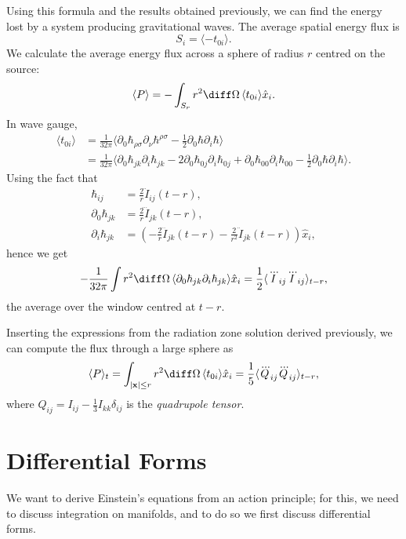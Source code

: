 \documentclass[12pt]{article}
\begin{document}
Using this formula and the results obtained previously, we can find the energy lost by a system producing gravitational waves. The average spatial energy flux is
\[
S_i = \langle - t_{0i}\rangle.
\]
We calculate the average energy flux across a sphere of radius $r$ centred on the source:
\[
\langle P \rangle = - \int_{S_r} r^2 \diff \Omega \, \langle t_{0i} \rangle \hat x_i.
\]
In wave gauge,
\begin{align*}
	\langle t_{0i}\rangle &= \frac{1}{32\pi} \langle \partial_0 \hbar_{\rho\sigma} \partial_\nu \hbar^{\rho\sigma} - \frac 12 \partial_0 \hbar \partial_i \hbar \rangle \\
			      &= \frac{1}{32 \pi} \langle \partial_0 \hbar_{jk} \partial_i \hbar_{jk} - 2 \partial_0 \hbar_{0j} \partial_i \hbar_{0j} + \partial_0 \hbar_{00} \partial_i \hbar_{00} - \frac 12 \partial_0 \hbar \partial_i \hbar \rangle.
\end{align*}
Using the fact that
\begin{align*}
	\hbar_{ij} &= \frac 2r \ddot I_{ij}(t - r), \\
	\partial_0 \hbar_{jk} &= \frac 2r \dddot I_{jk} (t - r), \\
	\partial_i \hbar_{jk} &= \left( - \frac 2r \dddot I_{jk}(t - r) - \frac{2}{r^2} \ddot I_{jk}(t - r) \right) \hat x_i,
\end{align*}
hence we get
\[
- \frac{1}{32 \pi} \int r^2 \diff \Omega \, \langle \partial_0 \hbar_{jk} \partial_i \hbar_{jk} \rangle \hat x_i = \frac 12 \langle \dddot I_{ij} \dddot I_{ij} \rangle_{t - r},
\]
the average over the window centred at $t - r$.


Inserting the expressions from the radiation zone solution derived previously, we can compute the flux through a large sphere as
\[
\langle P \rangle_t = \int_{|\mathbf{x}| \leq r} r^2 \diff \Omega \, \langle t_{0i} \rangle \hat x_i = \frac 15 \langle \dddot Q_{ij} \dddot Q_{ij} \rangle_{t - r},
\]
where $Q_{ij} = I_{ij} - \frac 13 I_{kk} \delta_{ij}$ is the \emph{quadrupole tensor}.

\newpage

\section{Differential Forms}%
\label{sec:dfs}

We want to derive Einstein's equations from an action principle; for this, we need to discuss integration on manifolds, and to do so we first discuss differential forms.
\end{document}
